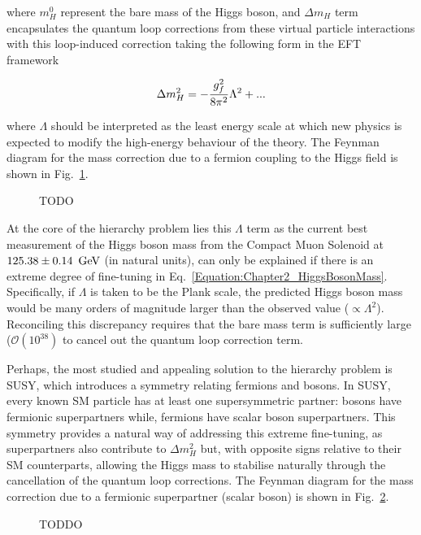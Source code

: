 where $m_H^0$ represent the bare mass of the Higgs boson, and $\Delta m_H$ term encapsulates the quantum loop corrections from these virtual particle interactions with this loop-induced correction taking the following form in the EFT framework

\begin{equation}
    \Delta m_H^2 = -\frac{g_f^2}{8\pi^2}\Lambda^2 + \space \text{...}
\end{equation}

where $\Lambda$ should be interpreted as the least energy scale at which new physics is expected to modify the high-energy behaviour of the theory. The Feynman diagram for the mass correction due to a fermion coupling to the Higgs field is shown in Fig.~\ref{Figure:Chapter2_Hierarchy_Feynman1}.

\begin{figure}[h]
\centering

\caption{TODO}
\label{Figure:Chapter2_Hierarchy_Feynman1}
\end{figure}

At the core of the hierarchy problem lies this $\Lambda$ term as the current best measurement of the Higgs boson mass from the Compact Muon Solenoid at $125.38 \pm 0.14~\,\text{Ge\hspace{-.08em}V}$ (in natural units), can only be explained if there is an extreme degree of fine-tuning in Eq.~\ref{Equation:Chapter2_HiggsBosonMass}. Specifically, if $\Lambda$ is taken to be the Plank scale, the predicted Higgs boson mass would be many orders of magnitude larger than the observed value ($\propto \Lambda^2$). Reconciling this discrepancy requires that the bare mass term is sufficiently large ($\mathcal{O}(10^{38})$ to cancel out the quantum loop correction term.

Perhaps, the most studied and appealing solution to the hierarchy problem is \ac{SUSY}, which introduces a symmetry relating fermions and bosons. In SUSY, every known SM particle has at least one supersymmetric partner: bosons have fermionic superpartners while, fermions have scalar boson superpartners. This symmetry provides a natural way of addressing this extreme fine-tuning, as superpartners also contribute to $\Delta m_H^2$ but, with opposite signs relative to their SM counterparts, allowing the Higgs mass to stabilise naturally through the cancellation of the quantum loop corrections. The Feynman diagram for the mass correction due to a fermionic superpartner (scalar boson) is shown in Fig.~\ref{Figure:Chapter2_Hierarchy_Feynman2}.

\begin{figure}[h]
\centering

\caption{TODDO}
\label{Figure:Chapter2_Hierarchy_Feynman2}
\end{figure}

